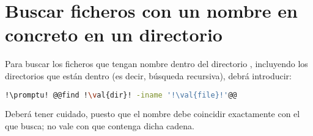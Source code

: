 \section{Buscar ficheros con un nombre en concreto en un directorio}\label{sec:buscar.tex}
Para buscar los ficheros que tengan nombre  dentro del directorio , incluyendo los
directorios que están dentro (es decir, búsqueda recursiva), debrá introducir:

\begin{lstlisting}[gobble=2,language=bash,style=bashinteract,escapechar=!]
  !\promptu! @@find !\val{dir}! -iname '!\val{file}!'@@
\end{lstlisting}

\noindent Deberá tener cuidado, puesto que el nombre  debe coincidir exactamente con el que busca;
no vale con que contenga dicha cadena.
